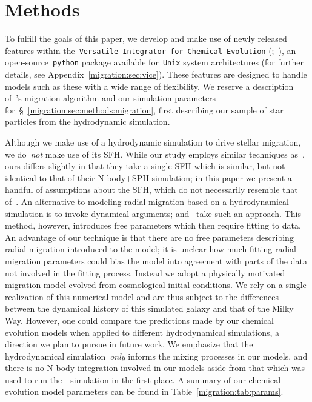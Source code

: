 
\section{Methods} 
\label{migration:sec:methods} 
To fulfill the goals of this paper, we develop and make use of newly released 
features within the~\texttt{Versatile Integrator for Chemical Evolution} 
(\vice;~\citealp{Johnson2020}), an open-source~\texttt{python} package 
available for~\texttt{Unix} system architectures (for further details, see 
Appendix~\ref{migration:sec:vice}). 
These features are designed to handle models such as these with a wide range of 
flexibility. 
We reserve a description of~\vice's migration algorithm and our simulation 
parameters for~\S~\ref{migration:sec:methods:migration}, first describing our sample of 
star particles from the hydrodynamic simulation. 
\par 
Although we make use of a hydrodynamic simulation to drive stellar migration, 
we do~\textit{not} make use of its SFH. 
While our study employs similar techniques as~\citet{Minchev2013}, ours differs 
slightly in that they take a single SFH which is similar, but not identical to 
that of their N-body+SPH simulation; in this paper we present a handful of 
assumptions about the SFH, which do not necessarily resemble that of~\hsim. 
An alternative to modeling radial migration based on a 
hydrodynamical simulation is to invoke dynamical arguments; 
\citet{Schoenrich2009a} and~\citet{Sharma2021} take such an approach. 
This method, however, introduces free parameters which then require fitting to 
data. 
An advantage of our technique is that there are no free parameters describing 
radial migration introduced to the model; it is unclear how much 
fitting radial migration parameters could bias the model into agreement with 
parts of the data not involved in the fitting process. 
Instead we adopt a physically motivated migration model evolved from 
cosmological initial conditions. 
We rely on a single realization of this numerical model and are thus subject to 
the differences between the dynamical history of this simulated galaxy and that 
of the Milky Way. 
However, one could compare the predictions made by our chemical evolution 
models when applied to different hydrodynamical simulations, a direction we 
plan to pursue in future work. 
We emphasize that the hydrodynamical simulation~\textit{only} informs the 
mixing processes in our models, and there is no N-body integration involved in 
our models aside from that which was used to run the~\hsim~simulation in the 
first place. 
A summary of our chemical evolution model parameters can be found in 
Table~\ref{migration:tab:params}. 

